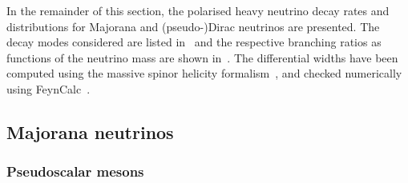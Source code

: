 In the remainder of this section, the polarised heavy neutrino decay rates and distributions %
for Majorana and (pseudo-)Dirac neutrinos are presented.
The decay modes considered are listed in~ and the respective branching ratios as functions of %
the neutrino mass are shown in~.
The differential widths have been computed using the massive spinor helicity formalism~\cite{Dittmaier:1998nn, Diaz-Cruz:2016ahc}, %
and checked numerically using FeynCalc~\cite{Shtabovenko:2016sxi,Mertig:1990an}.

\subsection{Majorana neutrinos}
\label{sec:decay_majorana}

\subsubsection{Pseudoscalar mesons}
\label{sec:decay_pseudoscalar}

